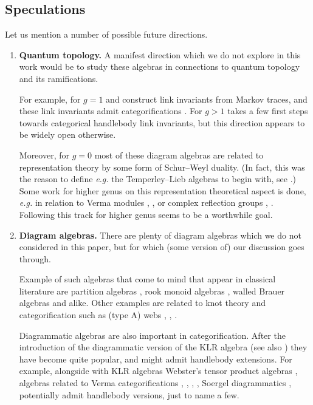 \documentclass[a4paper,11pt]{amsart}
\newcommand{\eg}{\textsl{e.g.}}
\numberwithin{equation}{section}
\begin{document}
\subsection{Speculations}

Let us mention a number of possible future directions.

\begin{enumerate}[label=$\bullet$]

\item \textbf{Quantum topology.} 
A manifest direction which we do not explore in 
this work would be to study these algebras 
in connections to quantum topology and its ramifications.

For example, for $g=1$ \cite{Geck-Lambropoulou} and \cite{OrRa-affine-braids}
construct link invariants 
from Markov traces, and
these link invariants admit categorifications \cite{WeWi}. 
For $g>1$ \cite{RoTu-homflypt-typea} takes a few first steps towards 
categorical handlebody link invariants, 
but this direction appears to be widely open otherwise.

Moreover, for $g=0$ most of these diagram algebras are related to 
representation theory by some form of Schur--Weyl duality. 
(In fact, this was the reason to define {\eg} the Temperley--Lieb 
algebras to begin with, see \cite{RuTeWe}.) 
Some work for higher genus on this representation theoretical 
aspect is done, 
{\eg} in relation to Verma modules \cite{IoLeZh-verma-schur-weyl}, 
\cite{LV}, \cite{DaRa-two-boundary-hecke} or complex reflection groups \cite{MaSt}, \cite{SaSh}. Following this track for higher genus
seems to be a worthwhile goal.

\item \textbf{Diagram algebras.} There are plenty 
of diagram algebras which we do not considered in this 
paper, but for which (some version of) our discussion goes through.

Example of such algebras that come to mind that appear in classical 
literature are partition algebras \cite{Martin},
rook monoid algebras \cite{Solomon}, walled 
Brauer algebras \cite{Koike} and alike. 
Other examples are related to knot theory and categorification 
such as (type A) webs \cite{CKM}, \cite{RoTu-symmetric-howe}, 
\cite{TVW}.

Diagrammatic algebras are also important in categorification. 
After the introduction of the diagrammatic version of the 
KLR algebra \cite{KL1} 
(see also \cite{Rouquier}) 
they have become quite popular, and might admit handlebody extensions.
For example, alongside with KLR algebras 
Webster's tensor product algebras \cite{webster}, 
algebras related to Verma categorifications 
\cite{naissevaz2}, \cite{naissevaz3}, \cite{maksimau-vaz}, \cite{lacabanne-naisse-vaz}, Soergel diagrammatics \cite{EW}, 
potentially admit handlebody versions, just to name a few.


\end{enumerate}
\end{document}

